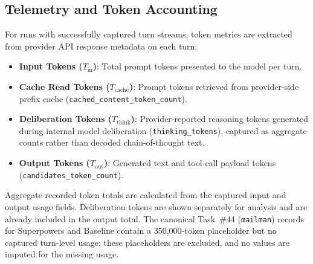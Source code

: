 \subsection{Telemetry and Token Accounting}
For runs with successfully captured turn streams, token metrics are extracted from provider API response metadata on each turn:
\begin{itemize}
    \item \textbf{Input Tokens ($T_{\text{in}}$)}: Total prompt tokens presented to the model per turn.
    \item \textbf{Cache Read Tokens ($T_{\text{cache}}$)}: Prompt tokens retrieved from provider-side prefix cache (\texttt{cached\_content\_token\_count}).
    \item \textbf{Deliberation Tokens ($T_{\text{think}}$)}: Provider-reported reasoning tokens generated during internal model deliberation (\texttt{thinking\_tokens}), captured as aggregate counts rather than decoded chain-of-thought text.
    \item \textbf{Output Tokens ($T_{\text{out}}$)}: Generated text and tool-call payload tokens (\texttt{candidates\_token\_count}).
\end{itemize}

Aggregate recorded token totals are calculated from the captured input and output usage fields. Deliberation tokens are shown separately for analysis and are already included in the output total. The canonical Task~\#44 (\texttt{mailman}) records for Superpowers and Baseline contain a 350,000-token placeholder but no captured turn-level usage; these placeholders are excluded, and no values are imputed for the missing usage.
